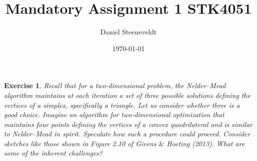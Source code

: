 \documentclass[a4paper,12pt]{article}
\title{Mandatory Assignment 1 STK4051}
\author{Daniel Steeneveldt}
\date{\today}
\theoremstyle{breaktheorem}
\theoremstyle{exerciseStyle}
\newtheorem{exercise}{Exercise}[section]
\theoremstyle{solutionStyle}
\begin{document}
\maketitle

\begin{exercise}
Recall that for a two-dimensional problem, the Nelder–Mead algorithm
maintains at each iteration a set of three possible solutions defining the
vertices of a simplex, specifically a triangle.
Let us consider whether three is a good choice. Imagine an algorithm
for two-dimensional optimization that maintains four points defining the
vertices of a convex quadrilateral and is similar to Nelder–Mead in spirit.
Speculate how such a procedure could proceed. Consider sketches like those
shown in Figure 2.10 of Givens $\&$ Hoeting (2013). What are some of the
inherent challenges?
\end{exercise}
\end{document}
